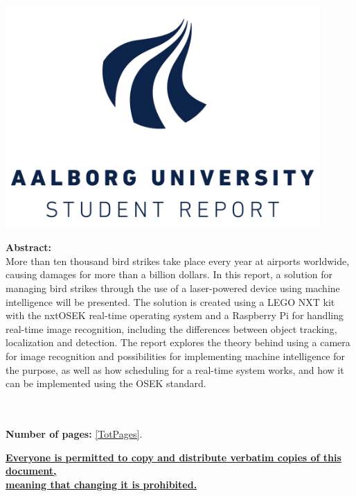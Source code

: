 \begin{minipage}[T]{0.45\textwidth}
 \begin{flushright}
  \includegraphics[width=0.9\textwidth]{images/aau_logo.pdf}\\
 \end{flushright}
 \begin{flushleft}
  \textbf{Abstract:}\\
    More than ten thousand bird strikes take place every year at airports worldwide, causing damages for more than a billion dollars. 
    In this report, a solution for managing bird strikes through the use of a laser-powered device using machine intelligence will be presented.
    The solution is created using a LEGO NXT kit with the nxtOSEK real-time operating system and a Raspberry Pi for handling real-time image recognition, including the differences between object tracking, localization and detection.
    The report explores the theory behind using a camera for image recognition and possibilities for implementing machine intelligence for the purpose, as well as how scheduling for a real-time system works, and how it can be implemented using the OSEK standard.


 \end{flushleft}
\end{minipage}\\
\\\large{\textsf{\textbf{\normalsize{Number of pages:}}}} \ref{TotPages}.\\
\begin{center}
 \begin{scriptsize}
  \textbf{\underline{Everyone is permitted to copy and distribute verbatim copies of this document,}}\\ \textbf{\underline{ meaning that changing it is prohibited.}}
 \end{scriptsize}
\end{center}
